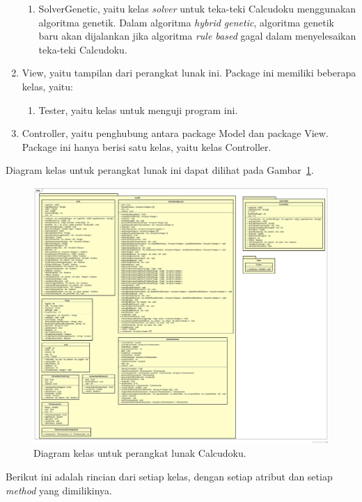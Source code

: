 \begin{enumerate}
\begin{enumerate}
	\item SolverGenetic, yaitu kelas \textit{solver} untuk teka-teki Calcudoku menggunakan algoritma genetik. Dalam algoritma \textit{hybrid genetic}, algoritma genetik baru akan dijalankan jika algoritma \textit{rule based} gagal dalam menyelesaikan teka-teki Calcudoku.
	\end{enumerate}
\item View, yaitu tampilan dari perangkat lunak ini. Package ini memiliki beberapa kelas, yaitu:
	\begin{enumerate}
	\item Tester, yaitu kelas untuk menguji program ini.
	\end{enumerate}
\item Controller, yaitu penghubung antara package Model dan package View. Package ini hanya berisi satu kelas, yaitu kelas Controller.
\end{enumerate}

Diagram kelas untuk perangkat lunak ini dapat dilihat pada Gambar~\ref{fig:diagramkelas}.

\begin{figure}
\centering
\captionsetup{justification=centering}
\includegraphics[scale=0.2]{Gambar/Perancangan/DiagramKelas.jpg}
\caption[Diagram kelas untuk perangkat lunak Calcudoku.]{Diagram kelas untuk perangkat lunak Calcudoku.}
\label{fig:diagramkelas}
\end{figure}

Berikut ini adalah rincian dari setiap kelas, dengan setiap atribut dan setiap \textit{method} yang dimilikinya.

